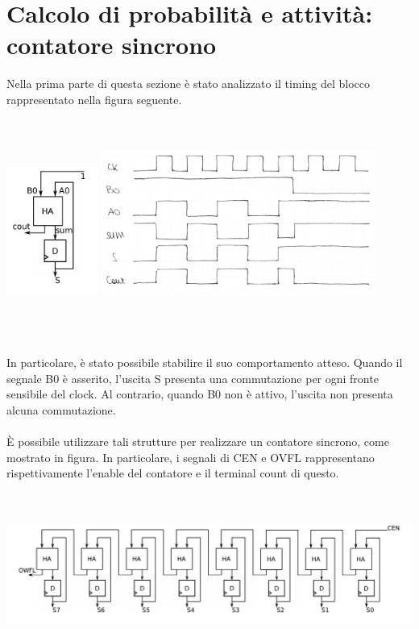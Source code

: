 \documentclass[11pt,  english, makeidx, a4paper, titlepage, oneside]{book}
\begin{document}
\section{Calcolo di probabilità e attività: contatore sincrono}
Nella prima parte di questa sezione è stato analizzato il timing del blocco 
rappresentato nella figura seguente.
\\\\\\
\centerline{\includegraphics[width=3cm]{./img/Lab_1/Es_5/Sync_FA.png}
			\includegraphics[width=9cm]{./img/Lab_1/Es_5/Half_add_contatore.png}}
\\\\\\
In particolare, è stato possibile stabilire il suo comportamento atteso. 
Quando il segnale B0 è asserito, l'uscita S presenta una commutazione 
per ogni fronte sensibile del clock. Al contrario, quando B0 non è attivo, 
l'uscita non presenta alcuna commutazione.
\\\\
È possibile utilizzare tali strutture per realizzare un contatore sincrono,
come mostrato in figura. In particolare, i segnali di CEN e OVFL rappresentano
rispettivamente l'enable del contatore e il terminal count di questo.
\\\\\\
\centerline{\includegraphics[width=17cm]{./img/Lab_1/Es_5/Counter.png}}
\end{document}
